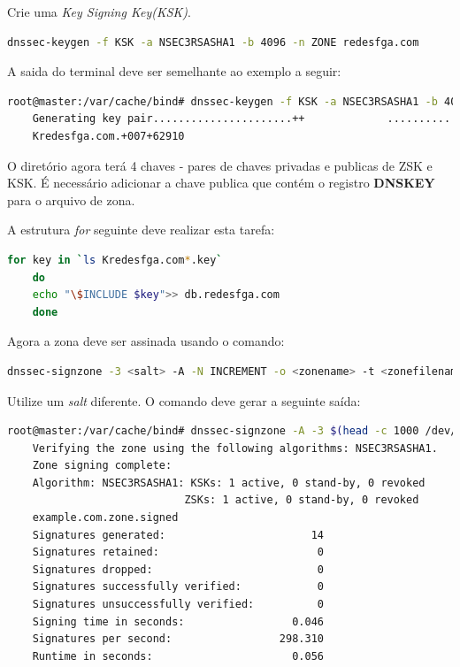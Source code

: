 \documentclass[12pt,openright,a4paper]{report}
\begin{document}
{Crie uma \textit{Key Signing Key(KSK)}.
\begin{lstlisting}[language=bash]
	dnssec-keygen -f KSK -a NSEC3RSASHA1 -b 4096 -n ZONE redesfga.com
\end{lstlisting}

A saida do terminal deve ser semelhante ao exemplo a seguir:
\begin{lstlisting}[language=bash]
	root@master:/var/cache/bind# dnssec-keygen -f KSK -a NSEC3RSASHA1 -b 4096 -n ZONE redesfga.com
	Generating key pair......................++ 			...........................................................................		++
	Kredesfga.com.+007+62910	
\end{lstlisting}

O diretório agora terá 4 chaves - pares de chaves privadas e publicas de ZSK e KSK. É necessário adicionar a chave publica que contém o registro \textbf{DNSKEY} para o arquivo de zona.

A estrutura \textit{for} seguinte deve realizar esta tarefa:
\begin{lstlisting}[language=bash]
	for key in `ls Kredesfga.com*.key`
	do
	echo "\$INCLUDE $key">> db.redesfga.com
	done
\end{lstlisting}

Agora a zona deve ser assinada usando o comando:
\begin{lstlisting}[language=bash]
	dnssec-signzone -3 <salt> -A -N INCREMENT -o <zonename> -t <zonefilename>
\end{lstlisting}

Utilize um \textit{salt} diferente. O comando deve gerar a seguinte saída:
\begin{lstlisting}[language=bash]
	root@master:/var/cache/bind# dnssec-signzone -A -3 $(head -c 1000 /dev/random | sha1sum | cut -b 1-16) -N 	INCREMENT -o redesfga.com -t db.redesfga.com
	Verifying the zone using the following algorithms: NSEC3RSASHA1.
	Zone signing complete:
	Algorithm: NSEC3RSASHA1: KSKs: 1 active, 0 stand-by, 0 revoked
    	                    ZSKs: 1 active, 0 stand-by, 0 revoked
	example.com.zone.signed
	Signatures generated:                       14
	Signatures retained:                         0
	Signatures dropped:                          0
	Signatures successfully verified:            0
	Signatures unsuccessfully verified:          0
	Signing time in seconds:                 0.046
	Signatures per second:                 298.310
	Runtime in seconds:                      0.056

\end{lstlisting}

}
\end{document}
